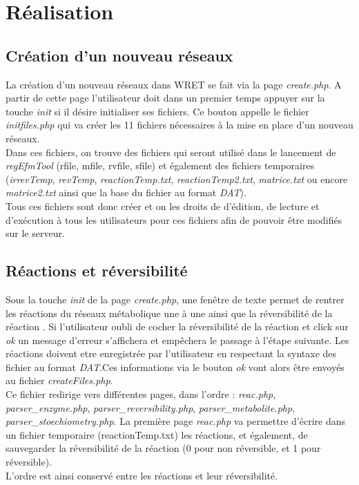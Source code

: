 \chapter{Réalisation}

\section{Création d'un nouveau réseaux}
La création d'un nouveau réseaux dans WRET se fait via la page \emph{create.php}.
A partir de cette page l'utilisateur doit dans un premier temps appuyer sur la touche \emph{init} si il désire initialiser ses fichiers. Ce bouton appelle le fichier \emph{initfiles.php} qui va créer les 11 fichiers nécessaires à la mise en place d'un nouveau réseaux.\\
Dans ces fichiers, on trouve des fichiers qui seront utilisé dans le lancement de \emph{regEfmTool} (rfile, mfile, rvfile, sfile) et également des fichiers temporaires (\emph{irrevTemp}, \emph{revTemp}, \emph{reactionTemp.txt}, \emph{reactionTemp2.txt}, \emph{matrice.txt} ou encore \emph{matrice2.txt} ainsi que la base du fichier au format \emph{DAT}).\\
Tous ces fichiers sont donc créer et on les droits de d'édition, de lecture et d'exécution à tous les utilisateurs pour ces fichiers afin de pouvoir être modifiés sur le serveur.

\section{Réactions et réversibilité}
Sous la touche \emph{init} de la page \emph{create.php}, une fenêtre de texte permet de rentrer les réactions du réseaux métabolique une à une ainsi que la réversibilité de la réaction . Si l'utilisateur oubli de cocher la réversibilité de la réaction et click sur \emph{ok} un message d'erreur s'affichera et empêchera le passage à l'étape suivante. Les réactions doivent etre enregistrée par l'utilisateur en respectant la syntaxe des fichier au format \emph{DAT}.Ces informations via le bouton \emph{ok} vont alors être envoyés au fichier \emph{createFiles.php}.\\
Ce fichier redirige vers différentes pages, dans l'ordre : \emph{reac.php}, \emph{parser\_enzyme.php}, \emph{parser\_reversibility.php}, \emph{parser\_metabolite.php}, \emph{parser\_stoechiometry.php}.
La première page \emph{reac.php} va permettre d'écrire dans un fichier temporaire (reactionTemp.txt) les réactions, et également, de sauvegarder la réversibilité de la réaction (0 pour non réversible, et 1 pour réversible).\\
L'ordre est ainsi conservé entre les réactions et leur réversibilité.

